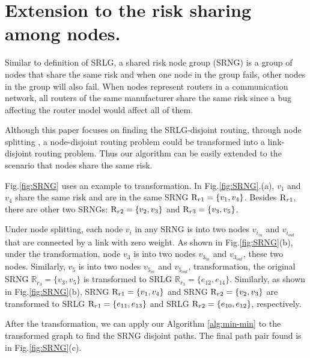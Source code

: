 \section{Extension to the risk sharing among nodes.}
\label{sec:Extension to the risk sharing among nodes}
Similar to  definition of SRLG, a shared risk node group (SRNG) is a group of nodes that share the same risk and when one node in the group fails, other nodes in the group will also fail.  When nodes represent routers in a communication network, all routers of the same manufacturer  share the same risk since a bug affecting the router model would affect all of them.

Although this paper focuses on finding the SRLG-disjoint routing, through node splitting \cite{ford2015flows}, a node-disjoint routing problem could be transformed into a link-disjoint routing problem. Thus our algorithm can be easily extended to the scenario that nodes share the same risk.

Fig.\ref{fig:SRNG} uses an example to  transformation. In Fig.\ref{fig:SRNG}.(a),  $v_1$ and $v_4$ share the same risk and are in the same SRNG ${{\rm{R}}_{r1}} = \left\{ {{v_1},{v_4}} \right\}$. Besides  ${{\rm{R}}_{r1}}$, there are other two SRNGs: ${{\rm{R}}_{r2}} = \left\{ {{v_2},{v_3}} \right\}$ and ${{\rm{R}}_{r3}} = \left\{ {{v_3},{v_5}} \right\}$.

Under node splitting, each node $v_i$ in any SRNG is  into two nodes $v_{i_{in}}$ and $v_{i_{out}}$ that are connected by a link with zero weight. As shown in Fig.\ref{fig:SRNG}(b), under the transformation, node $v_3$  is  into two  nodes $v_{3_{in}}$ and $v_{3_{out}}$,  these two nodes. Similarly, $v_5$ is  into two  nodes $v_{5_{in}}$ and $v_{5_{out}}$,  transformation, the original  SRNG $\mathbb{R}_{r_3}=\{v_3,v_5\}$ is transformed to SRLG $\mathbb{R}_{r_3}=\{e_{12},e_{14}\}$. Similarly, as shown in Fig.\ref{fig:SRNG}(b), SRNG ${{\rm{R}}_{r1}} = \left\{ {{v_1},{v_4}} \right\}$ and SRNG ${{\rm{R}}_{r2}} = \left\{ {{v_2},{v_3}} \right\}$  are transformed to SRLG ${{\rm{R}}_{r1}} = \left\{ {e_{11}, e_{13}} \right\}$ and SRLG ${{\rm{R}}_{r2}} = \left\{ {e_{10}, e_{12}} \right\}$, respectively.

After the transformation, we can apply our Algorithm \ref{alg:min-min} to the transformed graph to find the SRNG disjoint paths. The final path pair found is in Fig.\ref{fig:SRNG}(c).




